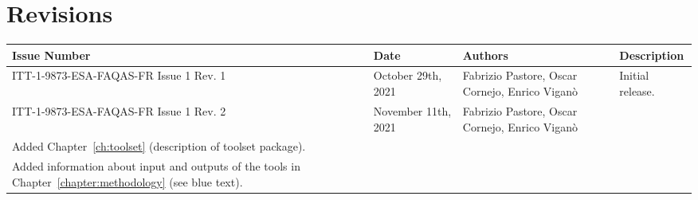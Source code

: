 
\section*{Revisions}
\label{sec:revisions}


\setlength\LTleft{0pt}
\setlength\LTright{0pt}
\tiny 
\begin{longtable}{|p{2cm}|p{1cm}|p{1.5cm}|p{9cm}|@{}}
\label{table:codeoperators} \\
\hline
\textbf{Issue Number}&\textbf{Date}&\textbf{Authors}&\textbf{Description}\\
\hline
ITT-1-9873-ESA-FAQAS-FR
Issue 1 Rev. 1&
October 29th, 2021&
Fabrizio Pastore, Oscar Cornejo, Enrico Viganò&
\begin{minipage}{8cm}
Initial release.
\end{minipage}
\\
\hline
ITT-1-9873-ESA-FAQAS-FR
Issue 1 Rev. 2&
November 11th, 2021&
Fabrizio Pastore, Oscar Cornejo, Enrico Viganò&
\begin{minipage}{8cm}
Added Chapter~\ref{chap:deliverables_summary} (deliverables summary).\\
Added Chapter~\ref{ch:toolset} (description of toolset package).\\
Added information about input and outputs of the tools in Chapter~\ref{chapter:methodology} (see blue text).
\end{minipage}
\\
\hline
                                                    
\end{longtable}
\normalsize

\clearpage